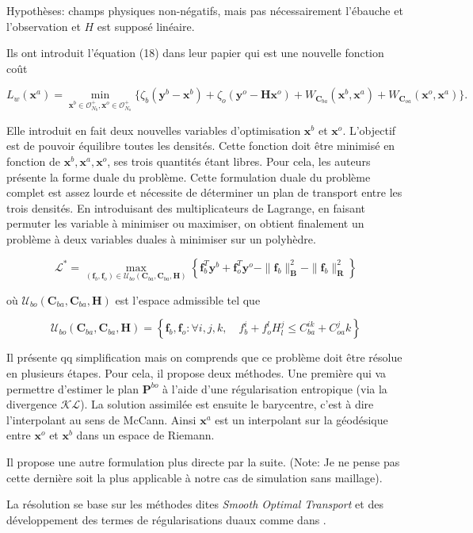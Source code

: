 \documentclass{article}
\newcommand{\norm}[1]{\|#1\|}
\newcommand{\bH}{\bm{H}}
\newcommand{\bbf}{\bm{f}}
\newcommand{\bR}{\bm{R}}
\newcommand{\bB}{\bm{B}}
\newcommand{\bC}{\bm{C}}
\newcommand{\bx}{\bm{x}}
\newcommand{\bP}{\bm{P}}
\newcommand{\by}{\bm{y}}
\begin{document}
Hypothèses: champs physiques non-négatifs, mais pas nécessairement l'ébauche et l'observation et $H$ est supposé linéaire.

Ils ont introduit l'équation (18) dans leur papier qui est une nouvelle fonction coût

$$
    L_w(\bx^a) = \min_{\bx^b \in \mathcal O_{N_b}^+, \bx^o \in \mathcal O_{N_o}^+} \{\zeta_b(\by^b - \bx^b) + \zeta_o(\by^o - \bH \bx^o) +W_{\bC_{ba}}(\bx^b, \bx^a) + W_{\bC_{oa}}(\bx^o, \bx^a)\}.
$$

Elle introduit en fait deux nouvelles variables d'optimisation $\bx^b$ et $\bx^o$. L'objectif est de pouvoir équilibre toutes les densités.
Cette fonction doit être minimisé en fonction de $\bx^b, \bx^a, \bx^o$, ses trois quantités étant libres.
Pour cela, les auteurs présente la forme duale du problème. Cette formulation duale du problème complet est assez lourde et nécessite de déterminer un plan de transport entre les trois densités. En introduisant des multiplicateurs de Lagrange, en faisant permuter les variable à minimiser ou maximiser, on obtient finalement un problème à deux variables duales à minimiser sur un polyhèdre.

$$
    \mathcal L^* = \max_{(\bbf_b,\bbf_o) \in \mathcal{U}_{bo}(\bC_{ba},\bC_{ba}, \bH)} \left\{\bbf_b^T \by^b + \bbf_o^T \by^o - \norm{\bbf_b}^2_{\bB} - \norm{\bbf_b}^2_{\bR} \right\}
$$

où $\mathcal{U}_{bo}(\bC_{ba},\bC_{ba}, \bH)$ est l'espace admissible tel  que

$$
    \mathcal{U}_{bo}(\bC_{ba},\bC_{ba}, \bH)  = \left\{ \bbf_b, \bbf_o : \forall i, j, k, \quad f^i_b + f^l_o H_l^j \leq C_{ba}^{ik} + C_{oa}^jk \right\}
$$

Il présente qq simplification mais on comprends que ce problème doit être résolue en plusieurs étapes.
Pour cela, il propose deux méthodes. Une première qui va permettre d'estimer le plan $\bP^{bo}$ à l'aide d'une régularisation entropique (via la divergence $\mathcal{KL}$). La solution assimilée est ensuite le barycentre, c'est à dire l'interpolant au sens de McCann. Ainsi $\bx^a$ est un interpolant sur la géodésique entre $\bx^o$ et $\bx^b$ dans un espace de Riemann.

Il propose une autre formulation plus directe par la suite. (Note: Je ne pense pas cette dernière soit la plus applicable à notre cas de simulation sans maillage).

La résolution se base sur les méthodes dites \textit{Smooth Optimal Transport} et des développement des termes de régularisations duaux comme dans \cite{blondel_smooth_2018}.
\end{document}
